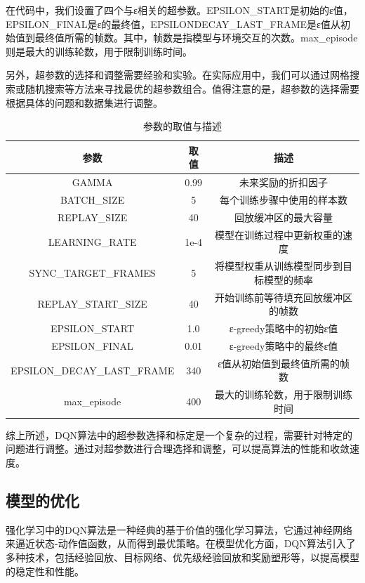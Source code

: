 在代码中，我们设置了四个与ε相关的超参数。EPSILON\_START是初始的ε值，EPSILON\_FINAL是ε的最终值，EPSILONDECAY\_LAST\_FRAME是ε值从初始值到最终值所需的帧数。其中，帧数是指模型与环境交互的次数。max\_episode则是最大的训练轮数，用于限制训练时间。

另外，超参数的选择和调整需要经验和实验。在实际应用中，我们可以通过网格搜索或随机搜索等方法来寻找最优的超参数组合。值得注意的是，超参数的选择需要根据具体的问题和数据集进行调整。

\renewcommand{\arraystretch}{1.2} %
\begin{table}[htbp]
\centering
\caption{参数的取值与描述}
\label{demand_inf}
\begin{tabular}{ccc}
\toprule
参数 & 取值 & 描述       \\
\midrule
GAMMA & 0.99 & 未来奖励的折扣因子 \\ 
BATCH\_SIZE & 5 & 每个训练步骤中使用的样本数 \\ 
REPLAY\_SIZE & 40 & 回放缓冲区的最大容量 \\ 
LEARNING\_RATE & 1e-4 & 模型在训练过程中更新权重的速度 \\ 
SYNC\_TARGET\_FRAMES & 5 & 将模型权重从训练模型同步到目标模型的频率 \\ 
REPLAY\_START\_SIZE & 40 & 开始训练前等待填充回放缓冲区的帧数 \\ 
EPSILON\_START & 1.0 & ε-greedy策略中的初始ε值 \\ 
EPSILON\_FINAL & 0.01 & ε-greedy策略中的最终ε值 \\ 
EPSILON\_DECAY\_LAST\_FRAME & 340 & ε值从初始值到最终值所需的帧数 \\ 
max\_episode & 400 & 最大的训练轮数，用于限制训练时间 \\ 

\bottomrule
\end{tabular}
\end{table}

综上所述，DQN算法中的超参数选择和标定是一个复杂的过程，需要针对特定的问题进行调整。通过对超参数进行合理选择和调整，可以提高算法的性能和收敛速度。

\subsection{模型的优化}

强化学习中的DQN算法是一种经典的基于价值的强化学习算法，它通过神经网络来逼近状态-动作值函数，从而得到最优策略。在模型优化方面，DQN算法引入了多种技术，包括经验回放、目标网络、优先级经验回放和奖励塑形等，以提高模型的稳定性和性能。

